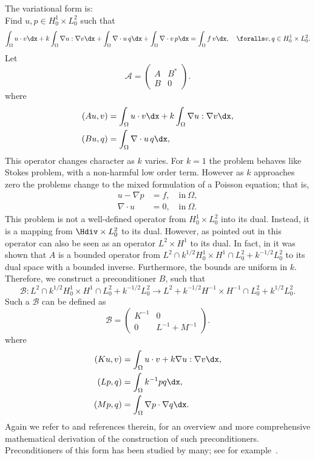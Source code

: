 The variational form is: \\
Find $u,p \in H^1_0 \times L_0^2$ such that
\[
\int_\Omega u \cdot v \dx +
k \int_\Omega \nabla u : \nabla v \dx +
\int_\Omega \nabla \cdot u \, q \dx +
\int_\Omega \nabla \cdot v \, p \dx = \int_\Omega f\, v \dx, \quad
\foralls v,q \in H^1_0 \times L_0^2.
\]
Let
\[
\mathcal{A}  =
\begin{pmatrix} A & B^* \\ B & 0 \end{pmatrix}.
\]
where
\begin{align}
  (A u, v) &= \int_\Omega u \cdot v \dx +  k \int_\Omega \nabla u : \nabla v \dx, \\
  (B u, q) &= \int_\Omega \nabla \cdot u \, q \dx,
\end{align}
This operator changes character as $k$ varies.  For $k=1$ the problem
behaves like Stokes problem, with a non-harmful low order
term. However as $k$ approaches zero the problems change to the mixed
formulation of a Poisson equation; that is,
\begin{align}
  u - \nabla p &= f, \quad \mbox{in} \ \Omega, \\
  \nabla \cdot u &= 0, \quad \mbox{in} \ \Omega.
\end{align}
This problem is not a well-defined operator from $H^1_0 \times L_0^2$
into its dual. Instead, it is a mapping from $\Hdiv \times L_0^2$ to
its dual.  However, as pointed out in \citet{MardalWinther2004} this
operator can also be seen as an operator $L^2 \times H^1$ to its dual.
In fact, in \citet{MardalTaiWinther2002,MardalWinther2004} it was
shown that $A$ is a bounded operator from $L^2 \cap k^{1/2}
H^1_0 \times H^1 \cap L_0^2 + k^{-1/2} L_0^2$ to its dual space with a
bounded inverse. Furthermore, the bounds are uniform in $k$.
Therefore, we construct a preconditioner $B$, such that
\[
\mathcal{B}: L^2 \cap k^{1/2} H^1_0 \times H^1 \cap L_0^2 + k^{-1/2} L_0^2 \rightarrow
L^2 + k^{-1/2} H^{-1} \times H^{-1} \cap L_0^2 + k^{1/2} L_0^2  .
\]
Such a $\mathcal{B}$ can be defined as
\[
\mathcal{B}
=
\begin{pmatrix} K^{-1} & 0 \\ 0 & L^{-1} + M^{-1} \end{pmatrix}.
\]
where
\begin{align}
  (K u, v) &= \int_\Omega u\cdot v  +  k \nabla u: \nabla v \dx, \\
  (L p, q) &= \int_\Omega k^{-1} p q \dx, \\
  (M p, q) &= \int_\Omega \nabla p \cdot  \nabla q \dx.
\end{align}
Again we refer to \citet{MardalWinther11} and references therein, for
an overview and more comprehensive mathematical derivation of the
construction of such preconditioners.  Preconditioners of this form
has been studied by many; see for
example~\citet{CahouetChabard1988,ElmanSilvesterWathen2005,MardalWinther2004,MardalWinther11,Turek1999}.

